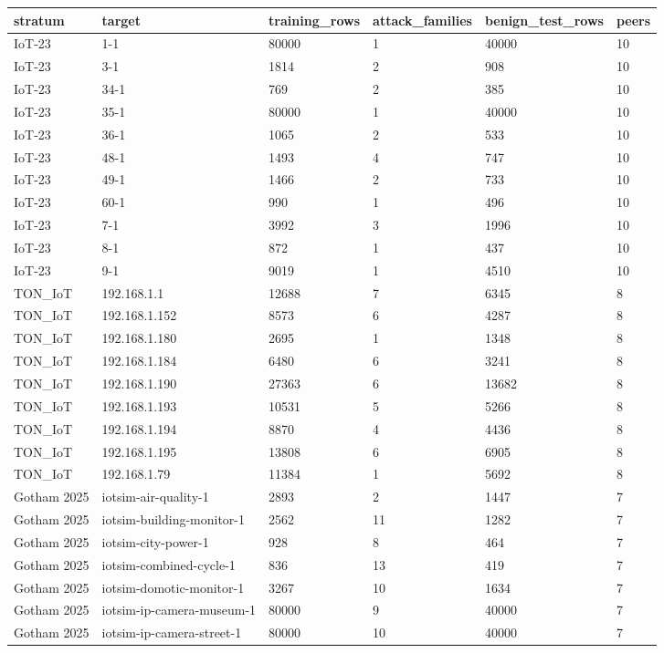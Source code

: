 \begin{tabular}{llllll}
\toprule
stratum & target & training\_rows & attack\_families & benign\_test\_rows & peers \\
\midrule
IoT-23 & 1-1 & 80000 & 1 & 40000 & 10 \\
IoT-23 & 3-1 & 1814 & 2 & 908 & 10 \\
IoT-23 & 34-1 & 769 & 2 & 385 & 10 \\
IoT-23 & 35-1 & 80000 & 1 & 40000 & 10 \\
IoT-23 & 36-1 & 1065 & 2 & 533 & 10 \\
IoT-23 & 48-1 & 1493 & 4 & 747 & 10 \\
IoT-23 & 49-1 & 1466 & 2 & 733 & 10 \\
IoT-23 & 60-1 & 990 & 1 & 496 & 10 \\
IoT-23 & 7-1 & 3992 & 3 & 1996 & 10 \\
IoT-23 & 8-1 & 872 & 1 & 437 & 10 \\
IoT-23 & 9-1 & 9019 & 1 & 4510 & 10 \\
TON\_IoT & 192.168.1.1 & 12688 & 7 & 6345 & 8 \\
TON\_IoT & 192.168.1.152 & 8573 & 6 & 4287 & 8 \\
TON\_IoT & 192.168.1.180 & 2695 & 1 & 1348 & 8 \\
TON\_IoT & 192.168.1.184 & 6480 & 6 & 3241 & 8 \\
TON\_IoT & 192.168.1.190 & 27363 & 6 & 13682 & 8 \\
TON\_IoT & 192.168.1.193 & 10531 & 5 & 5266 & 8 \\
TON\_IoT & 192.168.1.194 & 8870 & 4 & 4436 & 8 \\
TON\_IoT & 192.168.1.195 & 13808 & 6 & 6905 & 8 \\
TON\_IoT & 192.168.1.79 & 11384 & 1 & 5692 & 8 \\
Gotham 2025 & iotsim-air-quality-1 & 2893 & 2 & 1447 & 7 \\
Gotham 2025 & iotsim-building-monitor-1 & 2562 & 11 & 1282 & 7 \\
Gotham 2025 & iotsim-city-power-1 & 928 & 8 & 464 & 7 \\
Gotham 2025 & iotsim-combined-cycle-1 & 836 & 13 & 419 & 7 \\
Gotham 2025 & iotsim-domotic-monitor-1 & 3267 & 10 & 1634 & 7 \\
Gotham 2025 & iotsim-ip-camera-museum-1 & 80000 & 9 & 40000 & 7 \\
Gotham 2025 & iotsim-ip-camera-street-1 & 80000 & 10 & 40000 & 7 \\

\end{tabular}
